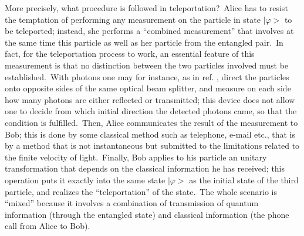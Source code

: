 \documentclass[12pt,onecolumn]{article}%
\begin{document}
More precisely, what procedure is followed in teleportation?\ Alice has to
resist the temptation of performing any measurement on the particle in state
$\mid\varphi>$ to be teleported; instead, she performs a ``combined
measurement'' that involves at the same time this particle as well as her
particle from the entangled pair.\ In fact, for the teleportation process to
work, an essential feature of this measurement is that no distinction between
the two particles involved must be established.\ With photons one may for
instance, as in ref. \cite{teleport-exp}, direct the particles onto opposite
sides of the same optical beam splitter, and measure on each side how many
photons are either reflected or transmitted; this device does not allow one to
decide from which initial direction the detected photons came, so that the
condition is fulfilled.\ Then, Alice communicates the result of the
measurement to Bob; this is done by some classical method such as telephone,
e-mail etc., that is by a method that is not instantaneous but submitted to
the limitations related to the finite velocity of light.\ Finally, Bob applies
to his particle an unitary transformation that depends on the classical
information he has received; this operation puts it exactly into the same
state $\mid\varphi>$ as the initial state of the third particle, and realizes
the ``teleportation'' of the state.\ The whole scenario is ``mixed'' because
it involves a combination of transmission of quantum information (through the
entangled state) and classical information (the phone call from Alice to Bob).
\end{document}

